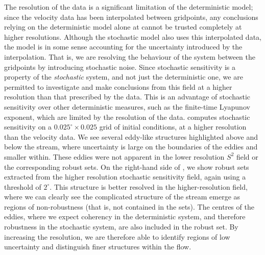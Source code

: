The resolution of the data is a significant limitation of the deterministic model; since the velocity data has been interpolated between gridpoints, any conclusions relying on the deterministic model alone at cannot be trusted completely at higher resolutions.
Although the stochastic model also uses this interpolated data, the model is in some sense accounting for the uncertainty introduced by the interpolation.
That is, we are resolving the behaviour of the system between the gridpoints by introducing stochastic noise.
Since stochastic sensitivity is a property of the \emph{stochastic} system, and not just the deterministic one, we are permitted to investigate and make conclusions from this field at a higher resolution than that prescribed by the data.
This is an advantage of stochastic sensitivity over other deterministic measures, such as the finite-time Lyapunov exponent, which are limited by the resolution of the data.
 computes stochastic sensitivity on a \(0.025^\circ\times 0.025\) grid of initial conditions, at a higher resolution than the velocity data.
We see several eddy-like structures highlighted above and below the stream, where uncertainty is large on the boundaries of the eddies and smaller within.
These eddies were not apparent in the lower resolution \(S^2\) field or the corresponding robust sets.
On the right-hand side of , we show robust sets extracted from the higher resolution stochastic sensitivity field, again using a threshold of \(2^\circ\).
This structure is better resolved in the higher-resolution field, where we can clearly see the complicated structure of the stream emerge as regions of non-robustness (that is, not contained in the sets).
The centres of the eddies, where we expect coherency in the deterministic system, and therefore robustness in the stochastic system, are also included in the robust set.
By increasing the resolution, we are therefore able to identify regions of low uncertainty and distinguish finer structures within the flow.





